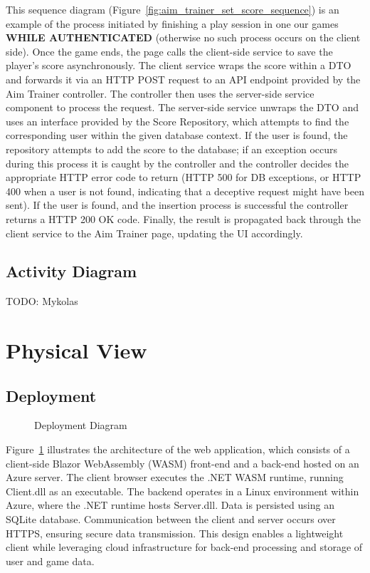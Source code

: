 \documentclass[11pt,a4paper]{article}
\newcommand{\inputdiagram}[1]{}
\begin{document}
This sequence diagram (Figure~\ref{fig:aim_trainer_set_score_sequence}) is an
example of the process initiated by finishing a play session in one our games
\textbf{WHILE AUTHENTICATED} (otherwise no such process occurs on the client
side). Once the game ends, the page calls the client-side service to save the
player's score asynchronously. The client service wraps the score within a
DTO and forwards it via an HTTP POST request to an API endpoint provided by
the Aim Trainer controller. The controller then uses the server-side service
component to process the request. The server-side service unwraps the DTO
and uses an interface provided by the Score Repository, which attempts
to find the corresponding user within the given database context.  If the
user is found, the repository attempts to add the score to the database;
if an exception occurs during this process it is caught by the controller
and the controller decides the appropriate HTTP error code to return (HTTP
500 for DB exceptions, or HTTP 400 when a user is not found, indicating
that a deceptive request might have been sent). If the user is found, and
the insertion process is successful the controller returns a HTTP 200 OK
code. Finally, the result is propagated back through the client service to
the Aim Trainer page, updating the UI accordingly.

\subsection{Activity Diagram}
TODO: Mykolas

\section{Physical View}
\subsection{Deployment}
\begin{figure}[H]
    \centering
    \begin{adjustbox}{width=0.92\paperwidth,center}
        \inputdiagram{deployment_diagram.tex}
     \end{adjustbox}
    \caption{Deployment Diagram}
    \label{fig:deployment_diagram}
\end{figure}

Figure~\ref{fig:deployment_diagram} illustrates the architecture of the web application,
which consists of a client-side Blazor WebAssembly (WASM) front-end and a back-end hosted on an Azure server. The client browser executes the .NET WASM
runtime, running Client.dll as an executable. The backend operates in a Linux
environment within Azure, where the .NET runtime hosts Server.dll. Data is
persisted using an SQLite database. Communication between the client and
server occurs over HTTPS, ensuring secure data transmission. This design
enables a lightweight client while leveraging cloud infrastructure for
back-end processing and storage of user and game data.
\end{document}
